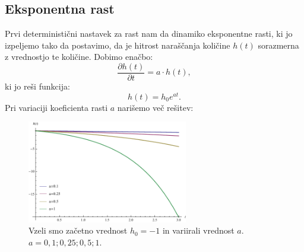 \documentclass[a4paper, twoside, 12pt]{book}
\begin{document}

\subsection{Eksponentna rast}

Prvi deterministični nastavek za rast nam da dinamiko eksponentne rasti, ki jo izpeljemo tako da postavimo, da je hitrost naraščanja količine $h(t)$ sorazmerna z vrednostjo te količine. Dobimo enačbo:
    \begin{equation}
      \frac{\partial h(t)}{\partial t} = a \cdot h(t),
      \label{dinamicna-eksponentna}
    \end{equation}
ki jo reši funkcija:
    \begin{equation}
      h(t) = h_0 e^{a t}.
      \label{dinamicna-eksponentna-resitev}
    \end{equation}
Pri variaciji koeficienta rasti $a$ narišemo več rešitev:

    \begin{figure}[h]
      \begin{center}
        \includegraphics[width=7cm]{slike/eksponentna-rast}
      \end{center}
      \caption{Vzeli smo začetno vrednost $h_0 = -1$ in variirali vrednost $a$. \newline $a=0,1;0,25;0,5;1$.}
      \label{fig:eksponentna-rast}
    \end{figure}
\end{document}
